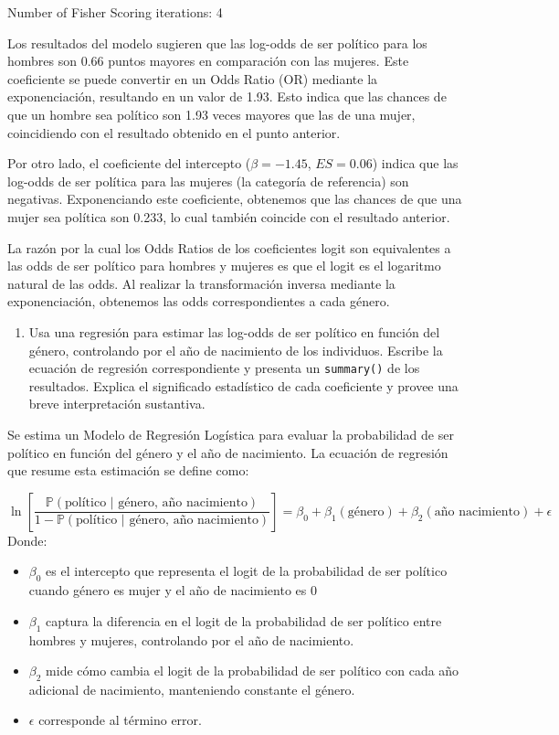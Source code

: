 \documentclass[
  12pt,
  a4paper,
]{article}
\providecommand{\tightlist}{%
  \setlength{\itemsep}{0pt}\setlength{\parskip}{0pt}}
\begin{document}
Number of Fisher Scoring iterations: 4

Los resultados del modelo sugieren que las log-odds de ser político para los hombres son 0.66 puntos mayores en comparación con las mujeres. Este coeficiente se puede convertir en un Odds Ratio (OR) mediante la exponenciación, resultando en un valor de 1.93. Esto indica que las chances de que un hombre sea político son 1.93 veces mayores que las de una mujer, coincidiendo con el resultado obtenido en el punto anterior.

Por otro lado, el coeficiente del intercepto (\(\beta = -1.45\), \(ES = 0.06\)) indica que las log-odds de ser política para las mujeres (la categoría de referencia) son negativas. Exponenciando este coeficiente, obtenemos que las chances de que una mujer sea política son 0.233, lo cual también coincide con el resultado anterior.

La razón por la cual los Odds Ratios de los coeficientes logit son equivalentes a las odds de ser político para hombres y mujeres es que el logit es el logaritmo natural de las odds. Al realizar la transformación inversa mediante la exponenciación, obtenemos las odds correspondientes a cada género.

\begin{enumerate}
\def\labelenumi{\arabic{enumi}.}
\setcounter{enumi}{2}
\tightlist
\item
  Usa una regresión para estimar las log-odds de ser político en función del género, controlando por el año de nacimiento de los individuos. Escribe la ecuación de regresión correspondiente y presenta un \texttt{summary()} de los resultados. Explica el significado estadístico de cada coeficiente y provee una breve interpretación sustantiva.
\end{enumerate}

Se estima un Modelo de Regresión Logística para evaluar la probabilidad de ser político en función del género y el año de nacimiento. La ecuación de regresión que resume esta estimación se define como:

\[
\ln\left[ \frac {\mathbb{P}(\text{político | género, año nacimiento}  ) }{ 1 - \mathbb{P}( \text{político | género, año nacimiento} ) } \right] = \beta_{0} + \beta_{1}(\text{género}) + \beta_{2}(\text{año nacimiento}) + \epsilon
\] Donde:

\begin{itemize}
\tightlist
\item
  \(\beta_{0}\) es el intercepto que representa el logit de la probabilidad de ser político cuando género es mujer y el año de nacimiento es 0
\item
  \(\beta_{1}\) captura la diferencia en el logit de la probabilidad de ser político entre hombres y mujeres, controlando por el año de nacimiento.
\item
  \(\beta_{2}\) mide cómo cambia el logit de la probabilidad de ser político con cada año adicional de nacimiento, manteniendo constante el género.
\item
  \(\epsilon\) corresponde al término error.
\end{itemize}
\end{document}
